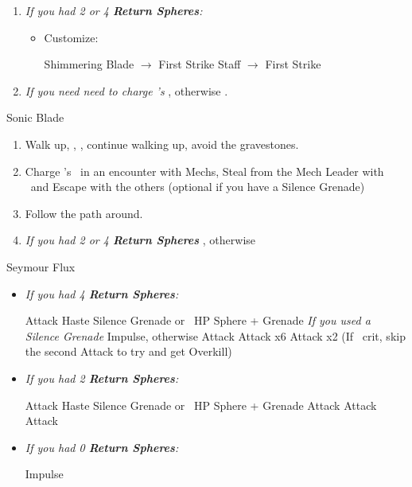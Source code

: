 \colstart
\begin{enumerate}[resume]
	\item \textit{If you had 2 or 4 \textbf{Return Spheres}:}
		\begin{itemize}
			\item Customize:
				\begin{itemize}
					\auronf Shimmering Blade $\rightarrow$ First Strike
					\yunaf Staff $\rightarrow$ First Strike
				\end{itemize}
		\end{itemize}
	\bothvfill
	\winvfill
	\lossvfill
	\item \textit{If you need need to charge \rikku's \od} \formation{\tidus}{\rikku}{\auron}, otherwise \formation{\tidus}{\kimahri}{\wakka}.
\end{enumerate}
\begin{equip}
	\begin{itemize}
		\auronf Sonic Blade
	\end{itemize}
\end{equip}
\begin{enumerate}[resume]
	\item Walk up, \sd, \cs[1:20], continue walking up, avoid the gravestones.
	\item Charge \rikku's \od\ in an encounter with Mechs, Steal from the Mech Leader with \rikku\ and Escape with the others (optional if you have a Silence Grenade)
	\item Follow the path around.
	\item \textit{If you had 2 or 4 \textbf{Return Spheres}} \formation{\tidus}{\yuna}{\auron}, otherwise \formation{\tidus}{\kimahri}{\wakka}
\end{enumerate}
\begin{battle}[70000]{Seymour Flux}
	\begin{itemize}
		\item \textit{If you had 4 \textbf{Return Spheres}:}
			\begin{itemize}
				\yunaf Attack
				\tidusf Haste \yuna
				\switch{\auron}{\rikku}
				\rikkuf Silence Grenade or \od\ HP Sphere + Grenade
				\summon{\bahamut}
				\bahamutf \textit{If you used a Silence Grenade} Impulse, otherwise Attack
				\yunaf Attack x6
				\tidusf Attack x2 (If \yuna\ crit, skip the second Attack to try and get Overkill)
			\end{itemize}
		\item \textit{If you had 2 \textbf{Return Spheres}:}
			\begin{itemize}
				\yunaf Attack
				\tidusf Haste \yuna
				\switch{\auron}{\rikku}
				\rikkuf Silence Grenade or \od\ HP Sphere + Grenade
				\summon{\bahamut}
				\bahamutf Attack
				\yunaf Attack
				\tidusf Attack
			\end{itemize}		
		\item \textit{If you had 0 \textbf{Return Spheres}:}
			\begin{itemize}
				\switch{\tidus}{\yuna}
				\summon{\bahamut}
				\bahamutf Impulse
			\end{itemize}
	\end{itemize}
\end{battle}
